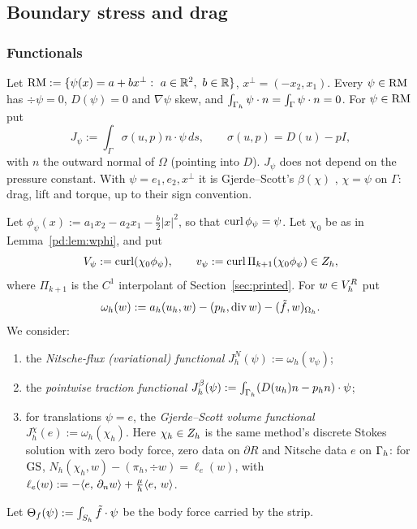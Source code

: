 \subsection{Boundary stress and drag}\label{pd:sec:drag}

\subsubsection{Functionals}
Let $\RM:=\{\psi(x)=a+bx^\perp:\ a\in\R^2,\ b\in\R\}$, $x^\perp=(-x_2,x_1)$. Every $\psi\in\mathrm{RM}$ has $\div\psi=0$, $D(\psi)=0$ and $\nabla\psi$ skew, and $\int_{\Gamma_h}\psi\cdot n=\int_\Gamma\psi\cdot n=0$. For $\psi\in\mathrm{RM}$ put
\[
J_\psi:=\int_\Gamma\sigma(u,p)n\cdot\psi\,ds,\qquad\sigma(u,p)=D(u)-pI,
\]
with $n$ the outward normal of $\Omega$ (pointing into $D$). $J_\psi$ does not depend on the pressure constant. With $\psi=e_1,e_2,x^\perp$ it is Gjerde--Scott's $\beta(\chi)$ \cite[(3),~(7)]{GjerdeScott2024}, $\chi=\psi$ on $\Gamma$: drag, lift and torque, up to their sign convention.

\begin{definition}\label{pd:def:funct}
Let $\phi_\psi(x):=a_1x_2-a_2x_1-\frac b2|x|^2$, so that $\operatorname{curl}\phi_\psi=\psi$. Let $\chi_0$ be as in Lemma~\ref{pd:lem:wphi}, and put
\[
V_\psi:=\operatorname{curl}(\chi_0\phi_\psi),\qquad v_\psi:=\operatorname{curl}\Pi_{k+1}(\chi_0\phi_\psi)\in Z_h,
\]
where $\Pi_{k+1}$ is the $C^1$ interpolant of Section~\ref{sec:printed}. For $w\in V_h^R$ put
\[
\omega_h(w):=a_h(u_h,w)-(p_h,\operatorname{div} w)-(\tilde f,w)_{\Omega_h}.
\]
We consider:
\begin{enumerate}[label=(\roman*)]
\item the \emph{Nitsche-flux (variational) functional} $J^N_h(\psi):=\omega_h(v_\psi)$;
\item the \emph{pointwise traction functional} $J^\beta_h(\psi):=\int_{\Gamma_h}(D(u_h)n-p_hn)\cdot\psi$;
\item for translations $\psi=e$, the \emph{Gjerde--Scott volume functional} $J^\chi_h(e):=\omega_h(\chi_h)$. Here $\chi_h\in Z_h$ is the same method's discrete Stokes solution with zero body force, zero data on $\partial R$ and Nitsche data $e$ on $\Gamma_h$: for $\mathrm{GS}$, $N_h(\chi_h,w)-(\pi_h,\div w)=\ell_e(w)$, with $\ell_e(w):=-\langle e,\, \partial_n w\rangle+\frac\mu h\langle e,\, w\rangle$.
\end{enumerate}
Let $\Theta_f(\psi):=\int_{S_h}\tilde f\cdot\psi$ be the body force carried by the strip.
\end{definition}


